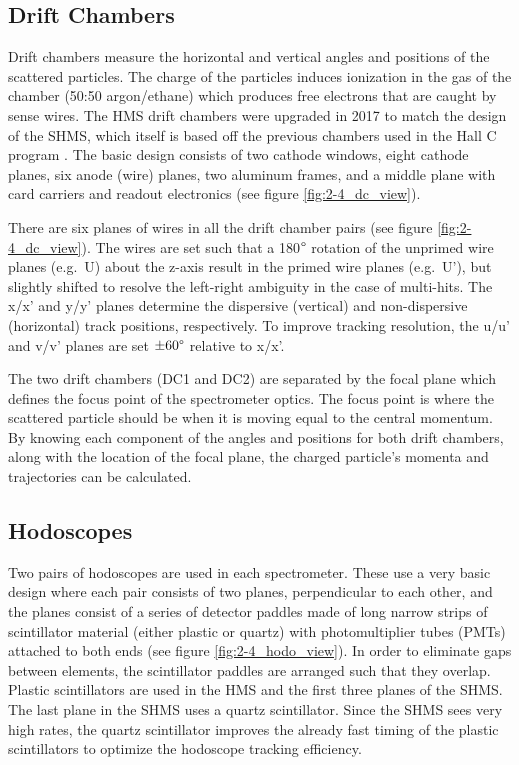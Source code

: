 \documentclass[
]{report}
\begin{document}
\hypertarget{drift-chambers}{%
\subsection{Drift Chambers}\label{drift-chambers}}

Drift chambers measure the horizontal and vertical angles and positions
of the scattered particles. The charge of the particles induces
ionization in the gas of the chamber (50:50 argon/ethane) which produces
free electrons that are caught by sense wires. The HMS drift chambers
were upgraded in 2017 to match the design of the SHMS, which itself is
based off the previous chambers used in the Hall C program
\cite{pandey_status_2017} \cite{tang_hall_2017}
\cite{christy_hall_2016}. The basic design consists of two cathode
windows, eight cathode planes, six anode (wire) planes, two aluminum
frames, and a middle plane with card carriers and readout electronics
(see figure \ref{fig:2-4_dc_view}).

There are six planes of wires in all the drift chamber pairs (see figure
\ref{fig:2-4_dc_view}). The wires are set such that a 180\(\degree\)
rotation of the unprimed wire planes (e.g.~U) about the z-axis result in
the primed wire planes (e.g.~U'), but slightly shifted to resolve the
left-right ambiguity in the case of multi-hits. The x/x' and y/y' planes
determine the dispersive (vertical) and non-dispersive (horizontal)
track positions, respectively. To improve tracking resolution, the u/u'
and v/v' planes are set \(\pm60\degree\) relative to x/x'.



The two drift chambers (DC1 and DC2) are separated by the focal plane
which defines the focus point of the spectrometer optics. The focus
point is where the scattered particle should be when it is moving equal
to the central momentum. By knowing each component of the angles and
positions for both drift chambers, along with the location of the focal
plane, the charged particle's momenta and trajectories can be
calculated.

\hypertarget{hodoscopes}{%
\subsection{Hodoscopes}\label{hodoscopes}}

Two pairs of hodoscopes are used in each spectrometer. These use a very
basic design where each pair consists of two planes, perpendicular to
each other, and the planes consist of a series of detector paddles made
of long narrow strips of scintillator material (either plastic or
quartz) with photomultiplier tubes (PMTs) attached to both ends (see
figure \ref{fig:2-4_hodo_view}). In order to eliminate gaps between
elements, the scintillator paddles are arranged such that they overlap.
Plastic scintillators are used in the HMS and the first three planes of
the SHMS. The last plane in the SHMS uses a quartz scintillator. Since
the SHMS sees very high rates, the quartz scintillator improves the
already fast timing of the plastic scintillators to optimize the
hodoscope tracking efficiency.
\end{document}
